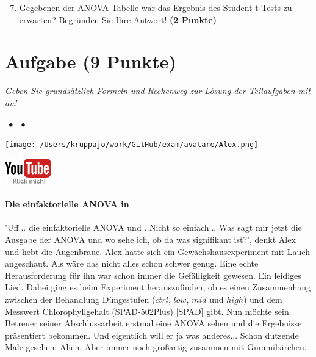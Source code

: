 \documentclass[a4paper, 9pt]{scrartcl}\usepackage[]{graphicx}\usepackage[]{xcolor}
\begin{document}
\begin{enumerate}
  \setcounter{enumi}{6}
\item Gegebenen der ANOVA Tabelle war das Ergebnis des Student t-Tests zu erwarten? Begründen Sie Ihre Antwort! \textbf{(2 Punkte)}
\end{enumerate}

 
\clearpage

\section{Aufgabe \hfill (9 Punkte)}

\textit{Geben Sie grundsätzlich Formeln und Rechenweg zur Lösung der Teilaufgaben mit an!} \\[1Ex]
 

 
\ifcollection
\begin{flushright}
\tiny\vspace{-3Ex}
\textbf{\examinhaltstart}
\exammodulemathstat $\;\bullet$
\exammodulestat $\;\bullet$
\exammodulestatbbv
\vspace{-4Ex}
\end{flushright}
\begin{minipage}[t]{0.5\textwidth}
\texttt{[image: /Users/kruppajo/work/GitHub/exam/avatare/Alex.png]}
\end{minipage}
\begin{minipage}[t]{0.5\textwidth}
\hfill
\href{https://youtu.be/aXvxGC4YLqk}{\includegraphics[width = 2cm]{img/youtube}}
\end{minipage}
\vspace{-3Ex}
\fi



\ifcollection
\paragraph{Die einfaktorielle ANOVA in \Rlogo}
\fi

'Uff... die einfaktorielle ANOVA und \Rlogo. Nicht so einfach... Was sagt mir jetzt die Ausgabe der ANOVA und wo sehe ich, ob da was signifikant ist?', denkt Alex und hebt die Augenbraue. Alex hatte sich ein Gewächshausexperiment mit Lauch angeschaut. Als wäre das nicht alles schon schwer genug. Eine echte Herausforderung für ihn war schon immer die Gefälligkeit gewesen. Ein leidiges Lied. Dabei ging es beim Experiment herauszufinden, ob es einen Zusammenhang zwischen der Behandlung Düngestufen ($ctrl$, $low$, $mid$ und $high$) und dem Messwert Chlorophyllgehalt (SPAD-502Plus) [SPAD] gibt. Nun möchte sein Betreuer seiner Abschlussarbeit erstmal eine ANOVA sehen und die Ergebnisse präsentiert bekommen. Und eigentlich will er ja was anderes... Schon dutzende Male gesehen: Alien. Aber immer noch großartig zusammen mit Gummibärchen.
\end{document}
